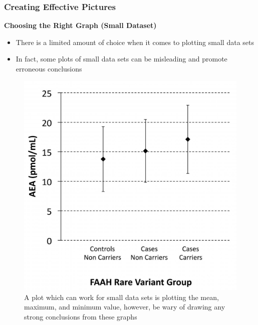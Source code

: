 \documentclass{beamer}
\begin{document}
\begin{frame}
\frametitle{Creating Effective Pictures}
\textbf{Choosing the Right Graph (Small Dataset)}\\
\vspace{0.2cm}
\begin{itemize}
\item There is a limited amount of choice when it comes to plotting small data sets
\vspace{0.2cm}
\item In fact, some plots of small data sets can be misleading and promote erroneous conclusions
\end{itemize}
\vspace{-0.2cm}
\begin{figure}
\includegraphics[scale=0.08]{small_data}
\vspace{-0.2cm}
\caption{A plot which can work for small data sets is plotting the mean, maximum, and minimum value, however, be wary of drawing any strong conclusions from these graphs}
\end{figure}
\end{frame}
\end{document}
